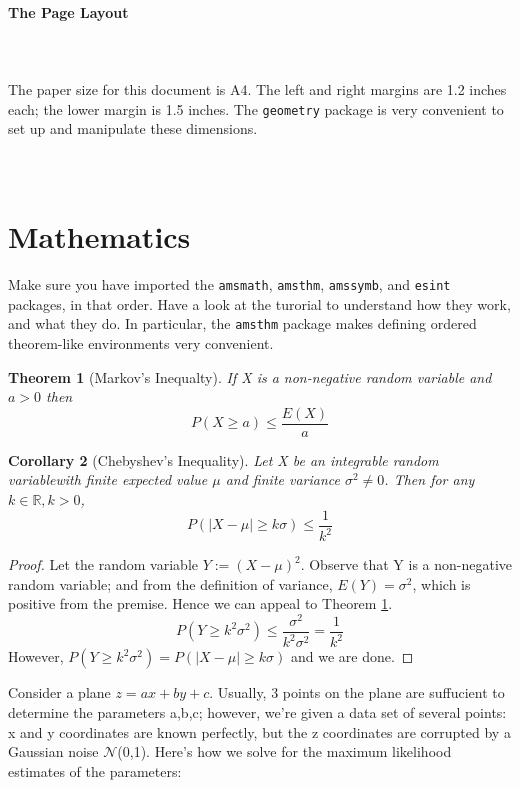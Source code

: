 \documentclass[a4paper]{article}
\newcommand{\R}{\mathbb{R}}
\newtheorem{theorem}{Theorem}
\newtheorem{corollary}[theorem]{Corollary}
\begin{document}
\paragraph{The Page Layout}\mbox{}\\\mbox{}\\
The paper size for this document is A4. The left and right margins are 1.2 inches each; the lower margin is 1.5 inches. The \texttt{geometry} package is very convenient to set up and manipulate these dimensions.\mbox{}\\\mbox{}\\\mbox{}\\
\section{Mathematics}
Make sure you have imported the \texttt{amsmath}, \texttt{amsthm}, \texttt{amssymb}, and \texttt{esint} packages, in that order. Have a look at the turorial to understand how they work, and what they do. In particular, the \texttt{amsthm} package makes defining ordered theorem-like environments very convenient.\par
\begin{theorem}[Markov's Inequalty]
\label{theorem1}
If X is a non-negative random variable and $a>0$ then
\[P(X\geq a)\leq \frac{E(X)}{a}\]
\end{theorem}
\begin{corollary}[Chebyshev's Inequality]
\label{corollary2}
Let X be an integrable random variablewith finite expected value $\mu$ and finite variance $\sigma^2 \neq 0$. Then for any $k\in\R,k>0$,
\[P(\mid X-\mu \mid \geq k\sigma)\leq \frac{1}{k^2}\]
\end{corollary}
\begin{proof}
Let the random variable $Y := (X-\mu)^2$. Observe that Y is a non-negative random variable; and from the definition of variance, $E(Y)=\sigma^2$, which is positive from the premise. Hence we can appeal to Theorem \hyperref[theorem1]{1}.
\[P(Y\geq k^2\sigma^2)\leq \frac{\sigma^2}{k^2\sigma^2}=\frac{1}{k^2}\]
However, $P(Y\geq k^2\sigma^2)=P(\mid X-\mu \mid\geq k\sigma)$ and we are done.
\end{proof}
Consider a plane $z=ax+by+c$. Usually, 3 points on the plane are suffucient to determine the parameters a,b,c; however, we're given a data set of several points: x and y coordinates are known perfectly, but the z coordinates are corrupted by a Gaussian noise $\mathcal{N}$(0,1). Here's how we solve for the maximum likelihood estimates of the parameters:
\end{document}
